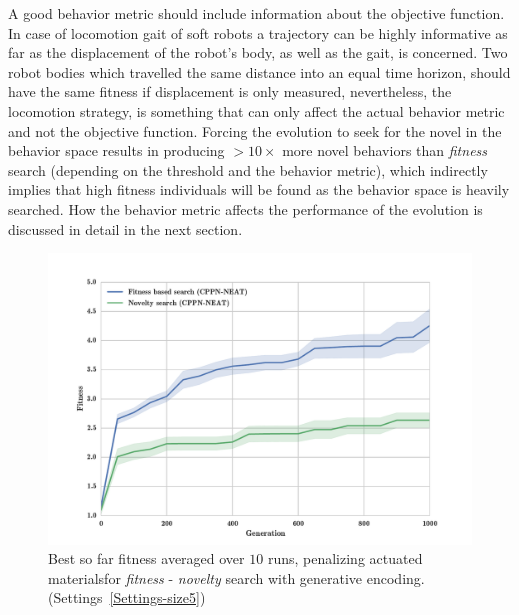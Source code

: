 A good behavior metric should include information about the objective function. In case of locomotion gait of soft robots a trajectory can be highly informative as far as the displacement of the robot's body, as well as the gait, is concerned. Two robot bodies which travelled the same distance into an equal time horizon, should have the same fitness if displacement is only measured, nevertheless, the locomotion strategy, is something that can only affect the actual behavior metric and not the objective function. Forcing the evolution to seek for the novel in the behavior space results in producing $>10 \times$ more novel behaviors than \emph{fitness} search (depending on the threshold and the behavior metric), which  indirectly implies that high fitness individuals will be found as the behavior space is heavily searched. How the behavior metric affects the performance of the evolution is discussed in detail in the next section.

\begin{figure}
\centering
\includegraphics[width=1.0\textwidth]{../Figures/Results/FitNovSize5Pen2.pdf}
\caption[]{Best so far fitness averaged over $10$ runs, penalizing actuated materials\footnotemark for \emph{fitness} - \emph{novelty} search with generative encoding. (Settings~\ref{Settings-size5})}
\label{fig:FitNovSize5Pen2}
\end{figure}




